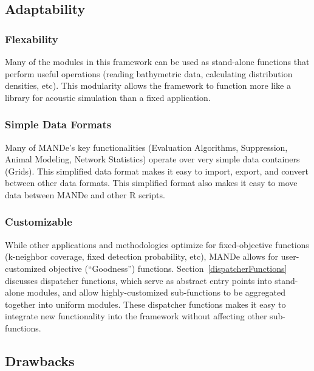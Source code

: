 \subsection{Adaptability}
\subsubsection{Flexability}
Many of the modules in this framework can be used as stand-alone functions that perform useful operations (reading bathymetric data, calculating distribution densities, etc).  This modularity allows the framework to function more like a library for acoustic simulation than a fixed application.  

\subsubsection{Simple Data Formats}
Many of MANDe's key functionalities (Evaluation Algorithms, Suppression, Animal Modeling, Network Statistics) operate over very simple data containers (Grids).   This simplified data format makes it easy to import, export, and convert between other data formats.  This simplified format also makes it easy to move data between MANDe and other R scripts.

\subsubsection{Customizable}
While other applications and methodologies optimize for fixed-objective functions (k-neighbor coverage, fixed detection probability, etc), MANDe allows for user-customized objective (``Goodness'') functions.  Section~\ref{dispatcherFunctions} discusses dispatcher functions, which serve as abstract entry points into stand-alone modules, and allow highly-customized sub-functions to be aggregated together into uniform modules.  These dispatcher functions makes it easy to integrate new functionality into the framework without affecting other sub-functions.  

\subsection{Drawbacks}
